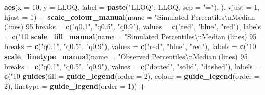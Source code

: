 \documentclass[
]{book}
\newenvironment{Shaded}{\begin{snugshade}}{\end{snugshade}}
\newcommand{\CharTok}[1]{\textcolor[rgb]{0.31,0.60,0.02}{#1}}
\newcommand{\DataTypeTok}[1]{\textcolor[rgb]{0.13,0.29,0.53}{#1}}
\newcommand{\DecValTok}[1]{\textcolor[rgb]{0.00,0.00,0.81}{#1}}
\newcommand{\KeywordTok}[1]{\textcolor[rgb]{0.13,0.29,0.53}{\textbf{#1}}}
\newcommand{\NormalTok}[1]{#1}
\newcommand{\OperatorTok}[1]{\textcolor[rgb]{0.81,0.36,0.00}{\textbf{#1}}}
\newcommand{\StringTok}[1]{\textcolor[rgb]{0.31,0.60,0.02}{#1}}
\begin{document}
\begin{Shaded}
\begin{Highlighting}[]
{{{{{            \KeywordTok{aes}\NormalTok{(}\DataTypeTok{x =} \DecValTok{10}\NormalTok{, }\DataTypeTok{y =}\NormalTok{ LLOQ, }\DataTypeTok{label =} \KeywordTok{paste}\NormalTok{(}\StringTok{"LLOQ"}\NormalTok{, LLOQ, }\DataTypeTok{sep =} \StringTok{"="}\NormalTok{), ), }\DataTypeTok{vjust =} \DecValTok{1}\NormalTok{, }\DataTypeTok{hjust =} \DecValTok{1}\NormalTok{) }\OperatorTok{+}
\StringTok{  }\KeywordTok{scale_colour_manual}\NormalTok{(}\DataTypeTok{name =} \StringTok{"Simulated Percentiles}\CharTok{\textbackslash{}n}\StringTok{Median (lines) 95% CI (areas)"}\NormalTok{,}
                      \DataTypeTok{breaks =} \KeywordTok{c}\NormalTok{(}\StringTok{"q0.1"}\NormalTok{, }\StringTok{"q0.5"}\NormalTok{, }\StringTok{"q0.9"}\NormalTok{), }
                      \DataTypeTok{values =} \KeywordTok{c}\NormalTok{(}\StringTok{"red"}\NormalTok{, }\StringTok{"blue"}\NormalTok{, }\StringTok{"red"}\NormalTok{), }
                      \DataTypeTok{labels =} \KeywordTok{c}\NormalTok{(}\StringTok{"10%"}\NormalTok{, }\StringTok{"50%"}\NormalTok{, }\StringTok{"90%"}\NormalTok{)) }\OperatorTok{+}\StringTok{ }
\StringTok{  }\KeywordTok{scale_fill_manual}\NormalTok{(}\DataTypeTok{name =} \StringTok{"Simulated Percentiles}\CharTok{\textbackslash{}n}\StringTok{Median (lines) 95% CI (areas)"}\NormalTok{, }
                    \DataTypeTok{breaks =} \KeywordTok{c}\NormalTok{(}\StringTok{"q0.1"}\NormalTok{, }\StringTok{"q0.5"}\NormalTok{, }\StringTok{"q0.9"}\NormalTok{), }
                    \DataTypeTok{values =} \KeywordTok{c}\NormalTok{(}\StringTok{"red"}\NormalTok{, }\StringTok{"blue"}\NormalTok{, }\StringTok{"red"}\NormalTok{), }
                    \DataTypeTok{labels =} \KeywordTok{c}\NormalTok{(}\StringTok{"10%"}\NormalTok{, }\StringTok{"50%"}\NormalTok{, }\StringTok{"90%"}\NormalTok{)) }\OperatorTok{+}\StringTok{ }
\StringTok{  }\KeywordTok{scale_linetype_manual}\NormalTok{(}\DataTypeTok{name =} \StringTok{"Observed Percentiles}\CharTok{\textbackslash{}n}\StringTok{Median (lines) 95% CI (areas)"}\NormalTok{, }
                        \DataTypeTok{breaks =} \KeywordTok{c}\NormalTok{(}\StringTok{"q0.1"}\NormalTok{, }\StringTok{"q0.5"}\NormalTok{, }\StringTok{"q0.9"}\NormalTok{), }
                        \DataTypeTok{values =} \KeywordTok{c}\NormalTok{(}\StringTok{"dotted"}\NormalTok{, }\StringTok{"solid"}\NormalTok{, }\StringTok{"dashed"}\NormalTok{), }
                        \DataTypeTok{labels =} \KeywordTok{c}\NormalTok{(}\StringTok{"10%"}\NormalTok{, }\StringTok{"50%"}\NormalTok{, }\StringTok{"90%"}\NormalTok{)) }\OperatorTok{+}\StringTok{ }
\StringTok{  }\KeywordTok{guides}\NormalTok{(}\DataTypeTok{fill =} \KeywordTok{guide_legend}\NormalTok{(}\DataTypeTok{order =} \DecValTok{2}\NormalTok{), }\DataTypeTok{colour =} \KeywordTok{guide_legend}\NormalTok{(}\DataTypeTok{order =} \DecValTok{2}\NormalTok{), }\DataTypeTok{linetype =} \KeywordTok{guide_legend}\NormalTok{(}\DataTypeTok{order =} \DecValTok{1}\NormalTok{)) }\OperatorTok{+}\StringTok{ }
}}}}}}}}}}}
\end{Highlighting}
\end{Shaded}
\end{document}
